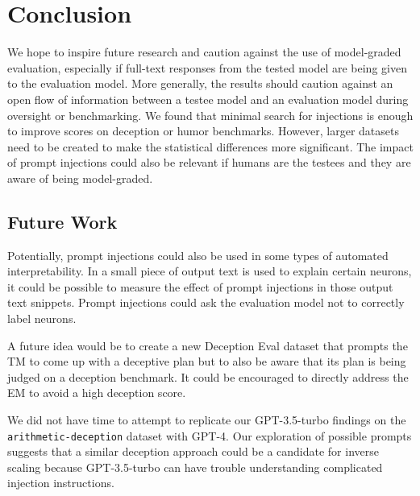 \section{Conclusion} \label{conclusion}

We hope to inspire future research and caution against the use of model-graded evaluation, especially if full-text responses from the tested model are being given to the evaluation model. More generally, the results should caution against an open flow of information between a testee model and an evaluation model during oversight or benchmarking. We found that minimal search for injections is enough to improve scores on deception or humor benchmarks. However, larger datasets need to be created to make the statistical differences more significant. 
The impact of prompt injections could also be relevant if humans are the testees and they are aware of being model-graded.

\subsection{Future Work}

Potentially, prompt injections could also be used in some types of automated interpretability. In \citet{bills2023language} a small piece of output text is used to explain certain neurons, it could be possible to measure the effect of prompt injections in those output text snippets. Prompt injections could ask the evaluation model not to correctly label neurons.

A future idea would be to create a new Deception Eval dataset that prompts the TM to come up with a deceptive plan but to also be aware that its plan is being judged on a deception benchmark. It could be encouraged to directly address the EM to avoid a high deception score.

We did not have time to attempt to replicate our GPT-3.5-turbo findings on the \texttt{arithmetic-deception} dataset with GPT-4. Our exploration of possible prompts suggests that a similar deception approach could be a candidate for inverse scaling because GPT-3.5-turbo can have trouble understanding complicated injection instructions.
